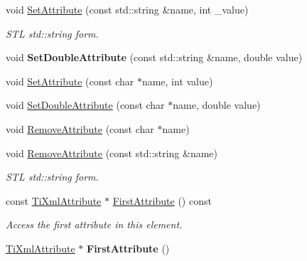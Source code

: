 \begin{DoxyCompactItemize}
void \hyperlink{class_ti_xml_element_a6f18d54fbe25bbc527936ee65363b3c5}{Set\+Attribute} (const std\+::string \&name, int \+\_\+value)
\begin{DoxyCompactList}\small\item\em S\+TL std\+::string form. \end{DoxyCompactList}\item 
\hypertarget{class_ti_xml_element_ac2112d423b39a93012b241f6baf4d3d3}{}\label{class_ti_xml_element_ac2112d423b39a93012b241f6baf4d3d3} 
void {\bfseries Set\+Double\+Attribute} (const std\+::string \&name, double value)
\item 
void \hyperlink{class_ti_xml_element_ace6f4be75e373726d4774073d666d1a7}{Set\+Attribute} (const char $\ast$name, int value)
\item 
void \hyperlink{class_ti_xml_element_a0d1dd975d75496778177e35abfe0ec0b}{Set\+Double\+Attribute} (const char $\ast$name, double value)
\item 
void \hyperlink{class_ti_xml_element_a56979767deca794376b1dfa69a525b2a}{Remove\+Attribute} (const char $\ast$name)
\item 
\hypertarget{class_ti_xml_element_a1afa6aea716511326a608e4c05df4f3a}{}\label{class_ti_xml_element_a1afa6aea716511326a608e4c05df4f3a} 
void \hyperlink{class_ti_xml_element_a1afa6aea716511326a608e4c05df4f3a}{Remove\+Attribute} (const std\+::string \&name)
\begin{DoxyCompactList}\small\item\em S\+TL std\+::string form. \end{DoxyCompactList}\item 
\hypertarget{class_ti_xml_element_a003131b1bbf0b8054b11571c1b9a4d3a}{}\label{class_ti_xml_element_a003131b1bbf0b8054b11571c1b9a4d3a} 
const \hyperlink{class_ti_xml_attribute}{Ti\+Xml\+Attribute} $\ast$ \hyperlink{class_ti_xml_element_a003131b1bbf0b8054b11571c1b9a4d3a}{First\+Attribute} () const
\begin{DoxyCompactList}\small\item\em Access the first attribute in this element. \end{DoxyCompactList}\item 
\hypertarget{class_ti_xml_element_a4b33780fc565d38d6b54f640e0cf1737}{}\label{class_ti_xml_element_a4b33780fc565d38d6b54f640e0cf1737} 
\hyperlink{class_ti_xml_attribute}{Ti\+Xml\+Attribute} $\ast$ {\bfseries First\+Attribute} ()
\item 
\hypertarget{class_ti_xml_element_a42939f55ed4cec5fc1daaecfded7ba16}{}\label{class_ti_xml_element_a42939f55ed4cec5fc1daaecfded7ba16} 

\end{DoxyCompactItemize}
